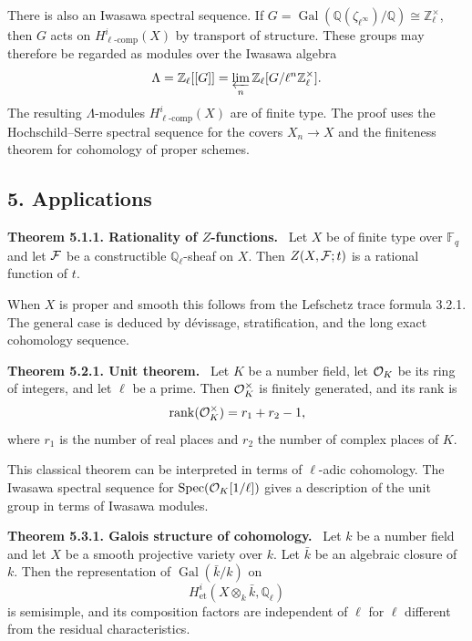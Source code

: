 \documentclass[11pt]{article}
\theoremstyle{plain}
\theoremstyle{definition}
\theoremstyle{remark}
\newenvironment{statement}[1]{\par\medskip\noindent\textbf{#1.}\ }{\par\medskip}
\newcommand{\bF}{\mathbb F}
\newcommand{\bQ}{\mathbb Q}
\newcommand{\bZ}{\mathbb Z}
\DeclareMathOperator{\Spec}{Spec}
\DeclareMathOperator{\Gal}{Gal}
\begin{document}
There is also an Iwasawa spectral sequence. If
$G=\Gal(\bQ(\zeta_{\ell^\infty})/\bQ)\cong\bZ_\ell^\times$, then $G$ acts on
$H^i_{\ell\text{-}\mathrm{comp}}(X)$ by transport of structure. These groups may
therefore be regarded as modules over the Iwasawa algebra
\[
      \Lambda=\bZ_\ell[[G]]=
      \varprojlim_n\bZ_\ell[G/\ell^n\bZ_\ell^\times].
\]
The resulting $\Lambda$-modules $H^i_{\ell\text{-}\mathrm{comp}}(X)$ are of finite
type. The proof uses the Hochschild--Serre spectral sequence for the covers
$X_n\to X$ and the finiteness theorem for cohomology of proper schemes.

\subsection*{5. Applications}

\begin{statement}{Theorem 5.1.1. Rationality of $Z$-functions}
Let $X$ be of finite type over $\bF_q$ and let $\mathcal F$ be a constructible
$\bQ_\ell$-sheaf on $X$. Then $Z(X,\mathcal F;t)$ is a rational function of $t$.
\end{statement}

When $X$ is proper and smooth this follows from the Lefschetz trace formula 3.2.1.
The general case is deduced by dévissage, stratification, and the long exact
cohomology sequence.

\begin{statement}{Theorem 5.2.1. Unit theorem}
Let $K$ be a number field, let $\mathcal O_K$ be its ring of integers, and let $\ell$ be a
prime. Then $\mathcal O_K^\times$ is finitely generated, and its rank is
\[
       \operatorname{rank}(\mathcal O_K^\times)=r_1+r_2-1,
\]
where $r_1$ is the number of real places and $r_2$ the number of complex places of
$K$.
\end{statement}

This classical theorem can be interpreted in terms of $\ell$-adic cohomology. The
Iwasawa spectral sequence for $\Spec(\cO_K[1/\ell])$ gives a description of the unit
group in terms of Iwasawa modules.

\begin{statement}{Theorem 5.3.1. Galois structure of cohomology}
Let $k$ be a number field and let $X$ be a smooth projective variety over $k$. Let
$\bar k$ be an algebraic closure of $k$. Then the representation of
$\Gal(\bar k/k)$ on
\[
      H^i_{\mathrm{et}}(X\otimes_k\bar k,\bQ_\ell)
\]
is semisimple, and its composition factors are independent of $\ell$ for $\ell$
different from the residual characteristics.
\end{statement}
\end{document}
